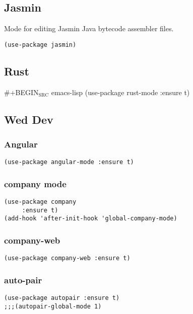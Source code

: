 \documentclass[11pt]{article}
\begin{document}
\subsection{Jasmin}
\label{sec-20-2}
Mode for editing Jasmin Java bytecode assembler files.

\begin{verbatim}
(use-package jasmin)
\end{verbatim}

\subsection{Rust}
\label{sec-20-3}

\#+BEGIN$_{\text{SRC}}$ emacs-lisp
(use-package rust-mode
:ensure t)

\subsection{Wed Dev}
\label{sec-20-4}
\subsubsection{Angular}
\label{sec-20-4-1}

\begin{verbatim}
(use-package angular-mode :ensure t)
\end{verbatim}

\subsubsection{company mode}
\label{sec-20-4-2}

\begin{verbatim}
(use-package company
     :ensure t)
(add-hook 'after-init-hook 'global-company-mode)
\end{verbatim}
\subsubsection{company-web}
\label{sec-20-4-3}

\begin{verbatim}
(use-package company-web :ensure t)
\end{verbatim}
\subsubsection{auto-pair}
\label{sec-20-4-4}

\begin{verbatim}
(use-package autopair :ensure t)
;;;(autopair-global-mode 1)
\end{verbatim}
\end{document}
